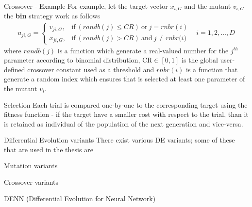 \documentclass[xcolor={usenames}]{beamer}
\begin{document}
  \begin{frame}{Crossover - Example}
  	For example, let the target vector $x_{i,G}$ and the mutant $v_{i,G}$ the \textbf{bin} strategy work as follows
\begin{align}
	u_{ji, G} = \begin{cases}
		v_{ji,G}, & \textrm{if}\ (\textit{randb}(j) \leq \textit{CR})\ \textrm{or}\ j=\textit{rnbr}(i)\\
		x_{ji,G}, & \textrm{if}\ (\textit{randb}(j) > \textit{CR})\ \textrm{and}\ j\neq\textit{rnbr(i)}
	\end{cases} & i=1,2,\dots,D
\end{align}
where  $\textit{randb}(j)$ is a function which generate a real-valued number for the $j^{th}$ parameter according to binomial distribution, $\textrm{CR}\in[0,1]$ is the global user-defined crossover constant used as a threshold and $\textit{rnbr}(i)$ is a function that generate a random index which ensures that is selected at least one parameter of the mutant $v_{i}$.
  \end{frame}
  \begin{frame}{Selection}
	Each trial is compared one-by-one to the corresponding target using the fitness function - if the target have a smaller cost with respect to the trial, than it is retained as individual of the population of the next generation and vice-versa.
  \end{frame}
  \begin{frame}{Differential Evolution variants}
  	There exist various DE variants; some of these that are used in the thesis are
  	\begin{itemize}
  	\end{itemize}
  \end{frame}
  \begin{frame}{Mutation variants}
  	
  \end{frame}
  \begin{frame}{Crossover variants}
  	
  \end{frame}
  \begin{frame}{DENN (Differential Evolution for Neural Network)}
  
  \end{frame}
\end{document}
